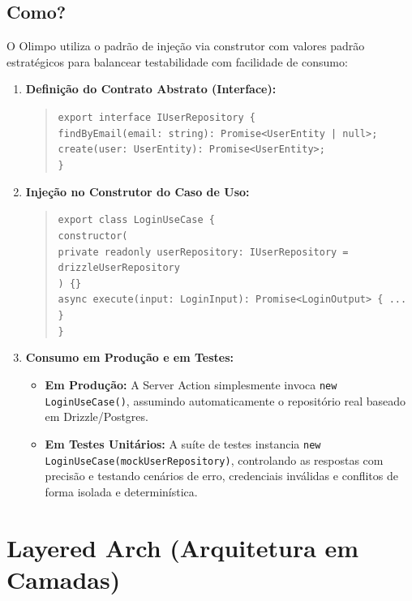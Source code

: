 \documentclass[12pt,a4paper]{article}
\begin{document}
\subsection{Como?}
O Olimpo utiliza o padrão de injeção via construtor com valores padrão estratégicos para balancear testabilidade com facilidade de consumo:
\begin{enumerate}
  \item \textbf{Definição do Contrato Abstrato (Interface):}
  \begin{quote}
    \texttt{export interface IUserRepository \{\\
    \quad findByEmail(email: string): Promise<UserEntity | null>;\\
    \quad create(user: UserEntity): Promise<UserEntity>;\\
    \}}
  \end{quote}
  \item \textbf{Injeção no Construtor do Caso de Uso:}
  \begin{quote}
    \texttt{export class LoginUseCase \{\\
    \quad constructor(\\
    \quad\quad private readonly userRepository: IUserRepository = drizzleUserRepository\\
    \quad ) \{\}\\
    \quad async execute(input: LoginInput): Promise<LoginOutput> \{ ... \}\\
    \}}
  \end{quote}
  \item \textbf{Consumo em Produção e em Testes:}
  \begin{itemize}
    \item \textbf{Em Produção:} A Server Action simplesmente invoca \texttt{new LoginUseCase()}, assumindo automaticamente o repositório real baseado em Drizzle/Postgres.
    \item \textbf{Em Testes Unitários:} A suíte de testes instancia \texttt{new LoginUseCase(mockUserRepository)}, controlando as respostas com precisão e testando cenários de erro, credenciais inválidas e conflitos de forma isolada e determinística.
  \end{itemize}
\end{enumerate}

\section{Layered Arch (Arquitetura em Camadas)}
\end{document}
